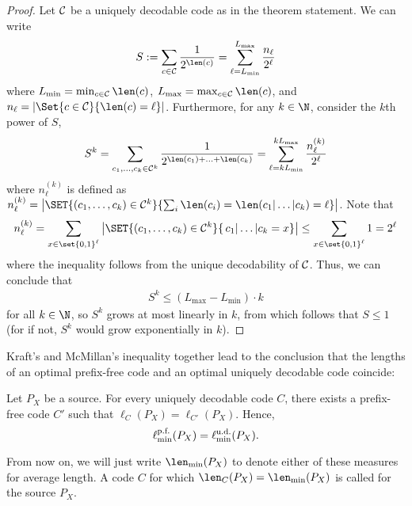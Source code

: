 \begin{proof}
Let ${\cal C}$ be a uniquely decodable code as in the theorem statement. We can write
\begin{align}
S := \sum_{c \in \cal C} \frac{1}{2^{\len(c)}} = \sum_{\ell = L_{\min}}^{L_{\max}} \frac{n_\ell}{2^\ell} 
\end{align}
where $L_{\min} = \min_{c \in \cal C} \len(c)$, $L_{\max} = \max_{c \in \cal C} \len(c)$, and $n_{\ell} = |\Set{c \in {\cal C}}{\len(c) = \ell}|$. Furthermore, for any $k \in \N$,  consider the $k$th power of $S$,
\begin{align}
S^k = \sum_{c_1,\ldots,c_k \in \mathcal{C}^k} \frac{1}{2^{\len(c_1)+\ldots+\len(c_k)}} = \sum_{\ell = k L_{\min}}^{k L_{\max}} \frac{n_\ell^{(k)}}{2^\ell} 
\end{align}
where $n_\ell^{(k)}$ is defined as $n_\ell^{(k)} = \big|\SET{(c_1,\ldots,c_k) \in {\cal C}^k}{\sum_i\len(c_i) = \len(c_1|\ldots|c_k) = \ell}\big|$. Note that
\begin{align}
n_\ell^{(k)} = \sum_{x \in \set{0,1}^{\ell}} \big|\SET{(c_1,\ldots,c_k) \in {\cal C}^k}{\,c_1|\ldots|c_k = x}\big| \leq \sum_{x \in \set{0,1}^{\ell}} 1 = 2^{\ell}
\end{align}
where the inequality follows from the unique decodability of $\cal C$. Thus, we can conclude that 
\begin{align}
S^k \leq (L_{\max} - L_{\min}) \cdot k 
\end{align}
for all $k \in \N$, so $S^k$ grows at most linearly in $k$, from which follows that $S \leq 1$ (for if not, $S^k$ would grow exponentially in $k$).
\end{proof}
Kraft's and McMillan's inequality together lead to the conclusion that the lengths of an optimal prefix-free code and an optimal uniquely decodable code coincide:
\begin{corollary}
Let $P_X$ be a source. For every uniquely decodable code $C$, there exists a prefix-free code $C'$ such that $\ell_C(P_X) = \ell_{C'}(P_X)$. Hence,
\[
\ell_{\min}^{\text{\rm p.f.}}(P_X) = \ell_{\min}^{\text{\rm u.d.}}(P_X).
\]
\end{corollary}
From now on, we will just write $\len_{\min}(P_X)$ to denote either of these measures for average length. A code $C$ for which $\len_C(P_X) = \len_{\min}(P_X)$ is called  for the source $P_X$. 




